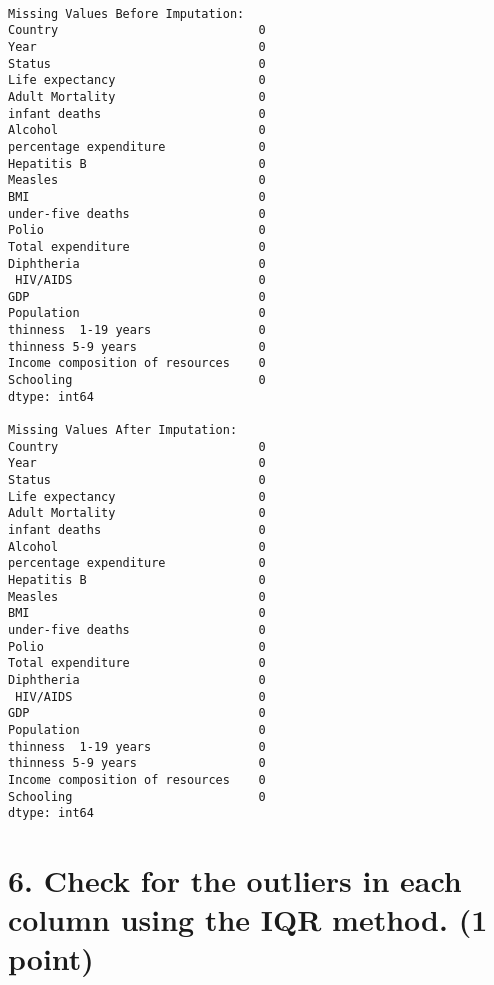 \documentclass[11pt]{article}
\begin{document}
    \begin{Verbatim}[commandchars=\\\{\}]

Missing Values Before Imputation:
Country                            0
Year                               0
Status                             0
Life expectancy                    0
Adult Mortality                    0
infant deaths                      0
Alcohol                            0
percentage expenditure             0
Hepatitis B                        0
Measles                            0
BMI                                0
under-five deaths                  0
Polio                              0
Total expenditure                  0
Diphtheria                         0
 HIV/AIDS                          0
GDP                                0
Population                         0
thinness  1-19 years               0
thinness 5-9 years                 0
Income composition of resources    0
Schooling                          0
dtype: int64

Missing Values After Imputation:
Country                            0
Year                               0
Status                             0
Life expectancy                    0
Adult Mortality                    0
infant deaths                      0
Alcohol                            0
percentage expenditure             0
Hepatitis B                        0
Measles                            0
BMI                                0
under-five deaths                  0
Polio                              0
Total expenditure                  0
Diphtheria                         0
 HIV/AIDS                          0
GDP                                0
Population                         0
thinness  1-19 years               0
thinness 5-9 years                 0
Income composition of resources    0
Schooling                          0
dtype: int64
    \end{Verbatim}

    \section{6. Check for the outliers in each column using the IQR method.
(1
point)}\label{check-for-the-outliers-in-each-column-using-the-iqr-method.-1-point}
\end{document}
